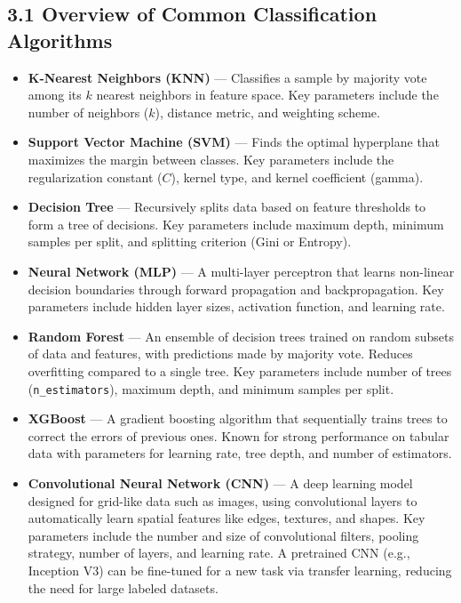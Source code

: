 \documentclass[12pt, a4paper]{article}
\begin{document}
\subsection*{3.1 Overview of Common Classification Algorithms}
\begin{itemize}
    \item \textbf{K-Nearest Neighbors (KNN)} --- Classifies a sample by majority vote among its $k$ nearest neighbors in feature space. Key parameters include the number of neighbors ($k$), distance metric, and weighting scheme.
    \item \textbf{Support Vector Machine (SVM)} --- Finds the optimal hyperplane that maximizes the margin between classes. Key parameters include the regularization constant ($C$), kernel type, and kernel coefficient (gamma).
    \item \textbf{Decision Tree} --- Recursively splits data based on feature thresholds to form a tree of decisions. Key parameters include maximum depth, minimum samples per split, and splitting criterion (Gini or Entropy).
    \item \textbf{Neural Network (MLP)} --- A multi-layer perceptron that learns non-linear decision boundaries through forward propagation and backpropagation. Key parameters include hidden layer sizes, activation function, and learning rate.
    \item \textbf{Random Forest} --- An ensemble of decision trees trained on random subsets of data and features, with predictions made by majority vote. Reduces overfitting compared to a single tree. Key parameters include number of trees (\texttt{n\_estimators}), maximum depth, and minimum samples per split.
    \item \textbf{XGBoost} --- A gradient boosting algorithm that sequentially trains trees to correct the errors of previous ones. Known for strong performance on tabular data with parameters for learning rate, tree depth, and number of estimators.
    \item \textbf{Convolutional Neural Network (CNN)} --- A deep learning model designed for grid-like data such as images, using convolutional layers to automatically learn spatial features like edges, textures, and shapes. Key parameters include the number and size of convolutional filters, pooling strategy, number of layers, and learning rate. A pretrained CNN (e.g., Inception V3) can be fine-tuned for a new task via transfer learning, reducing the need for large labeled datasets.
\end{itemize}
\end{document}
